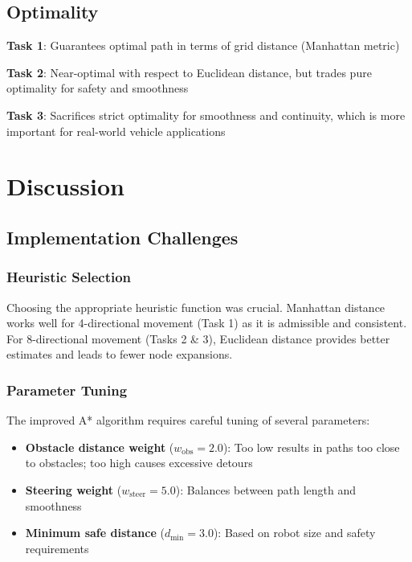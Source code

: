 \documentclass[aps,letterpaper,10pt]{revtex4}
\begin{document}
\subsection{Optimality}

\textbf{Task 1}: Guarantees optimal path in terms of grid distance (Manhattan metric)

\textbf{Task 2}: Near-optimal with respect to Euclidean distance, but trades pure optimality for safety and smoothness

\textbf{Task 3}: Sacrifices strict optimality for smoothness and continuity, which is more important for real-world vehicle applications

\newpage
\section{Discussion}

\subsection{Implementation Challenges}

\subsubsection{Heuristic Selection}

Choosing the appropriate heuristic function was crucial. Manhattan distance works well for 4-directional movement (Task 1) as it is admissible and consistent. For 8-directional movement (Tasks 2 \& 3), Euclidean distance provides better estimates and leads to fewer node expansions.

\subsubsection{Parameter Tuning}

The improved A* algorithm requires careful tuning of several parameters:

\begin{itemize}
    \item \textbf{Obstacle distance weight} ($w_{\text{obs}} = 2.0$): Too low results in paths too close to obstacles; too high causes excessive detours
    \item \textbf{Steering weight} ($w_{\text{steer}} = 5.0$): Balances between path length and smoothness
    \item \textbf{Minimum safe distance} ($d_{\text{min}} = 3.0$): Based on robot size and safety requirements
\end{itemize}
\end{document}
